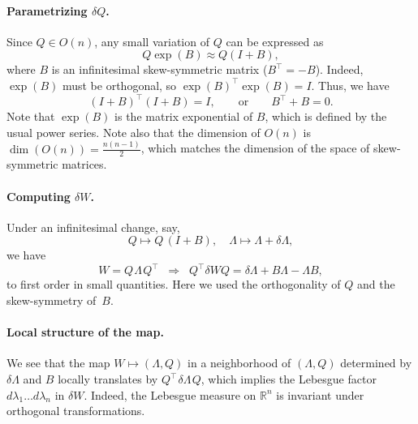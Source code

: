 \documentclass[letterpaper,11pt,oneside,reqno]{book}
\numberwithin{equation}{chapter}  %
\newcommand{\ssp}{\hspace{1pt}}
\theoremstyle{definition}
\begin{document}
\paragraph{Parametrizing \texorpdfstring{\(\delta Q\)}{}.}
Since \( Q \in O(n) \), any small variation of \( Q \) can be expressed as
\[ Q \exp(B) \approx Q(I + B), \] where \( B \) is an infinitesimal
skew-symmetric matrix (\( B^\top = -B \)). Indeed,
$\exp(B)$ must be orthogonal, so $\exp(B)^\top \exp(B) = I$.
Thus, we have
\begin{equation*}
	(I+B)^\top(I+B)=I,\qquad \text{or}\qquad B^\top + B = 0.
\end{equation*}
Note that $\exp(B)$ is the matrix exponential of $B$,
which is defined by the usual power series.
Note also that the dimension of \( O(n) \)
is \( \dim(O(n)) = \frac{n(n-1)}{2} \), which matches the dimension of the
space of skew-symmetric matrices.

\paragraph{Computing \texorpdfstring{\(\delta W\)}{}.}
Under an infinitesimal change, say,
\[
  Q \mapsto Q\,(I + B),
  \quad
  \Lambda \mapsto \Lambda + \delta\Lambda,
\]
we have
\[
  W
  = Q\ssp\Lambda\ssp Q^\top
  \;\;\Longrightarrow\;\;
  Q^\top \delta W Q
	=
	\delta\Lambda
	+
	B\Lambda-\Lambda B,
\]
to first order in small quantities.
Here we used the orthogonality of $Q$ and
the skew-symmetry of~$B$.

\paragraph{Local structure of the map.}

We see that the map
$W\mapsto(\Lambda,Q)$
in a neighborhood of $(\Lambda,Q)$ determined by
$\delta \Lambda$ and $B$
locally translates by $Q^\top\ssp\delta \Lambda\ssp Q$,
which implies the Lebesgue factor
$d\lambda_1 \ldots d\lambda_n $
in $\delta W$. Indeed, the Lebesgue measure
on $\mathbb{R}^n$ is invariant under orthogonal transformations.
\end{document}
